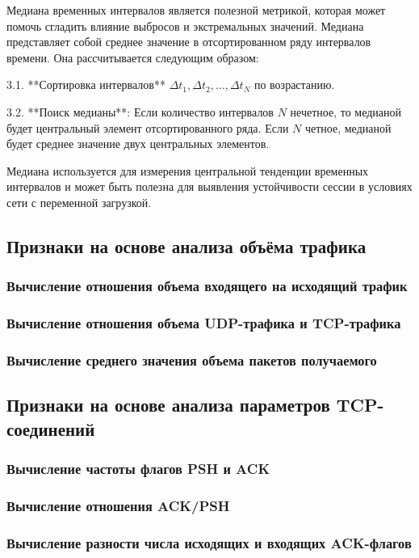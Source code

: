 \documentclass[bachelor, och, coursework]{SCWorks}
\begin{document}
   Медиана временных интервалов является полезной метрикой, которая может помочь сгладить влияние выбросов и экстремальных значений. Медиана представляет собой среднее значение в отсортированном ряду интервалов времени. Она рассчитывается следующим образом:

   3.1. **Сортировка интервалов** \( \Delta t_1, \Delta t_2, \dots, \Delta t_N \) по возрастанию.

   3.2. **Поиск медианы**: Если количество интервалов \( N \) нечетное, то медианой будет центральный элемент отсортированного ряда. Если \( N \) четное, медианой будет среднее значение двух центральных элементов.

   Медиана используется для измерения центральной тенденции временных интервалов и может быть полезна для выявления устойчивости сессии в условиях сети с переменной загрузкой.

\subsection{Признаки на основе анализа объёма трафика}
\subsubsection{Вычисление отношения объема входящего на исходящий трафик}
\subsubsection{Вычисление отношения объема UDP-трафика и TCP-трафика}
\subsubsection{Вычисление среднего значения объема пакетов получаемого}

\subsection{Признаки на основе анализа параметров TCP-соединений}

\subsubsection{Вычисление частоты флагов PSH и ACK}
\subsubsection{Вычисление отношения ACK/PSH}
\subsubsection{Вычисление разности числа исходящих и входящих ACK-флагов}
\end{document}
